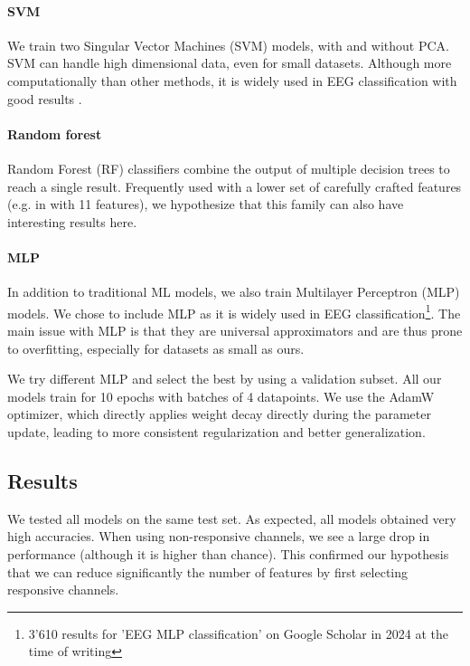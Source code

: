 \documentclass[10pt,conference,compsocconf]{IEEEtran}
\begin{document}
\paragraph{SVM}
We train two Singular Vector Machines (SVM) models, with and without PCA. SVM can handle high dimensional data, even for small datasets. Although more computationally than other methods, it is widely used in EEG classification with good results \cite{knn_svm_review}.

\paragraph{Random forest}
Random Forest (RF) classifiers combine the output of multiple decision trees to reach a single result. Frequently used with a lower set of carefully crafted features (e.g. in \cite{eegrfclassif} with 11 features), we hypothesize that this family can also have interesting results here.

\paragraph{MLP}
In addition to traditional ML models, we also train Multilayer Perceptron (MLP) models. We chose to include MLP as it is widely used in EEG classification\footnote{3'610 results for 'EEG MLP classification' on Google Scholar in 2024 at the time of writing}. The main issue with MLP is that they are universal approximators and are thus prone to overfitting, especially for datasets as small as ours.

We try different MLP and select the best by using a validation subset. All our models train for 10 epochs with batches of 4 datapoints. We use the AdamW optimizer, which directly applies weight decay directly during the parameter update, leading to more consistent regularization and better generalization.

\subsection{Results}
We tested all models on the same test set. As expected, all models obtained very high accuracies. When using non-responsive channels, we see a large drop in performance (although it is higher than chance). This confirmed our hypothesis that we can reduce significantly the number of features by first selecting responsive channels.
\end{document}
